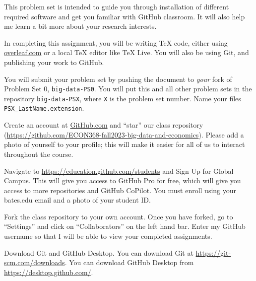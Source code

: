\documentclass[12pt,english]{exam}
\begin{document}
This problem set is intended to guide you through installation of different required software and get you familiar with GitHub classroom. It will also help me learn a bit more about your research interests. 

In completing this assignment, you will be writing TeX code, either using \url{overleaf.com} or a local TeX editor like TeX Live. You will also be using Git, and publishing your work to GitHub.

You will submit your problem set by pushing the document to \emph{your} fork of Problem Set 0, \texttt{big-data-PS0}. You will put this and all other problem sets in the repository \texttt{big-data-PSX}, where \texttt{X} is the problem set number. Name your files \texttt{PSX\_LastName.extension}.

\begin{questions}
\question Create an account at \url{GitHub.com} and ``star'' our class repository (\url{https://github.com/ECON368-fall2023-big-data-and-economics}). Please add a photo of yourself to your profile; this will make it easier for all of us to interact throughout the course. 

\question Navigate to \url{https://education.github.com/students} and Sign Up for Global Campus. This will give you access to GitHub Pro for free, which will give you access to more repositories and GitHub CoPilot. You must enroll using your bates.edu email and a photo of your student ID. 

\question Fork the class repository to your own account. Once you have forked, go to ``Settings'' and click on ``Collaborators'' on the left hand bar. Enter my GitHub username so that I will be able to view your completed assignments. 

\question Download Git and GitHub Desktop. You can download Git at \url{https://git-scm.com/downloads}. You can download GitHub Desktop from \url{https://desktop.github.com/}. 


\end{questions}
\end{document}
